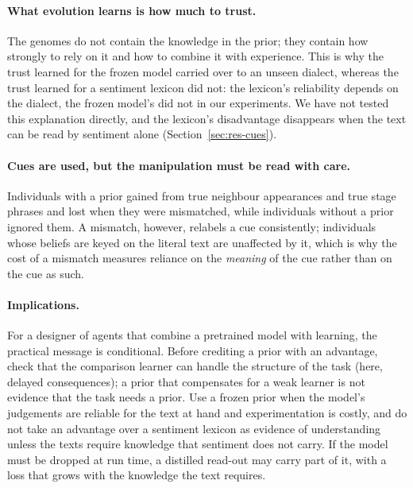 \paragraph{What evolution learns is how much to trust.}
The genomes do not contain the knowledge in the prior; they contain how strongly to rely on it and how to combine it with experience. This is why the trust learned for the frozen model carried over to an unseen dialect, whereas the trust learned for a sentiment lexicon did not: the lexicon's reliability depends on the dialect, the frozen model's did not in our experiments. We have not tested this explanation directly, and the lexicon's disadvantage disappears when the text can be read by sentiment alone (Section~\ref{sec:res-cues}).

\paragraph{Cues are used, but the manipulation must be read with care.}
Individuals with a prior gained from true neighbour appearances and true stage phrases and lost when they were mismatched, while individuals without a prior ignored them. A mismatch, however, relabels a cue consistently; individuals whose beliefs are keyed on the literal text are unaffected by it, which is why the cost of a mismatch measures reliance on the \emph{meaning} of the cue rather than on the cue as such.

\paragraph{Implications.}
For a designer of agents that combine a pretrained model with learning, the practical message is conditional. Before crediting a prior with an advantage, check that the comparison learner can handle the structure of the task (here, delayed consequences); a prior that compensates for a weak learner is not evidence that the task needs a prior. Use a frozen prior when the model's judgements are reliable for the text at hand and experimentation is costly, and do not take an advantage over a sentiment lexicon as evidence of understanding unless the texts require knowledge that sentiment does not carry. If the model must be dropped at run time, a distilled read-out may carry part of it, with a loss that grows with the knowledge the text requires.

